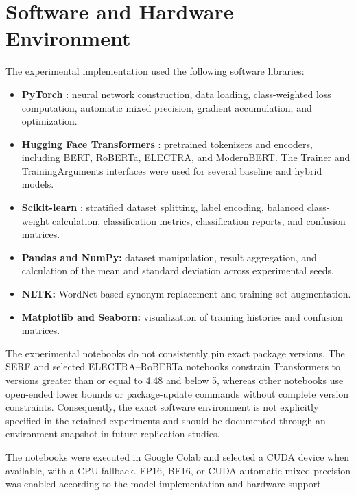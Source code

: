 \documentclass[runningheads]{llncs}
\begin{document}
\appendix

\section{Software and Hardware Environment}\label{app:software-reproducibility}

The experimental implementation used the following software libraries:

\begin{itemize}
\item \textbf{PyTorch} \cite{paszke_pytorch}: neural network construction, data loading, class-weighted loss computation, automatic mixed precision, gradient accumulation, and optimization.
\item \textbf{Hugging Face Transformers} \cite{wolf_transformers}: pretrained tokenizers and encoders, including BERT, RoBERTa, ELECTRA, and ModernBERT. The Trainer and TrainingArguments interfaces were used for several baseline and hybrid models.
\item \textbf{Scikit-learn} \cite{pedregosa_scikit}: stratified dataset splitting, label encoding, balanced class-weight calculation, classification metrics, classification reports, and confusion matrices.
\item \textbf{Pandas and NumPy:} dataset manipulation, result aggregation, and calculation of the mean and standard deviation across experimental seeds.
\item \textbf{NLTK:} WordNet-based synonym replacement and training-set augmentation.
\item \textbf{Matplotlib and Seaborn:} visualization of training histories and confusion matrices.
\end{itemize}

The experimental notebooks do not consistently pin exact package versions. The SERF and selected ELECTRA--RoBERTa notebooks constrain Transformers to versions greater than or equal to 4.48 and below 5, whereas other notebooks use open-ended lower bounds or package-update commands without complete version constraints. Consequently, the exact software environment is not explicitly specified in the retained experiments and should be documented through an environment snapshot in future replication studies.

The notebooks were executed in Google Colab and selected a CUDA device when available, with a CPU fallback. FP16, BF16, or CUDA automatic mixed precision was enabled according to the model implementation and hardware support.
\end{document}
